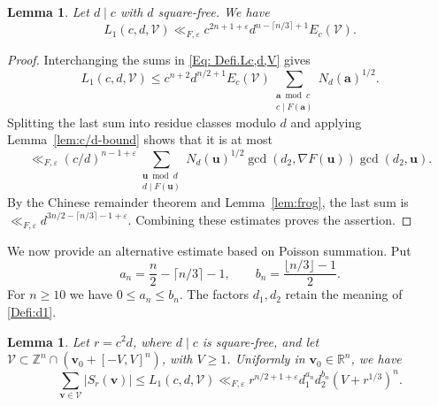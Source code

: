 \documentclass[a4paper,11pt, twoside,reqno]{amsart}
\theoremstyle{plain}
\newtheorem{lemma}[thm]{Lemma}
\theoremstyle{definition}
\theoremstyle{remark}
\newcommand{\bfv}{\bm{v}}
\newcommand{\ZZ}{\mathbb{Z}}
\newcommand{\RR}{\mathbb{R}}
\newcommand{\ve}{\varepsilon}
\renewcommand{\le}{\leqslant}
\renewcommand{\ge}{\geqslant}
\numberwithin{equation}{section}
\begin{document}
	
\begin{lemma}\label{lem:cube-sum1}
Let $d\mid c$ with $d$ square-free.
We have
\[
L_1(c,d,\mathcal V)
\ll_{F,\varepsilon}
c^{2n+1+\varepsilon}d^{n-\lceil n/3\rceil+1}E_c(\mathcal V).
\]
\end{lemma}

\begin{proof}
Interchanging the sums in \eqref{Eq: Defi.Lc,d,V} gives
\[
L_1(c,d,\mathcal V)
\le c^{n+2}d^{n/2+1}E_c(\mathcal V)
\sum_{\substack{\bm a\bmod c\\c\mid F(\bm a)}}N_d(\bm a)^{1/2}.
\]
Splitting the last sum into residue classes modulo $d$ and applying
Lemma~\ref{lem:c/d-bound} shows that it is at most
\[
\ll_{F,\varepsilon}(c/d)^{n-1+\varepsilon}
\sum_{\substack{\bm u\bmod d\\d\mid F(\bm u)}}
N_d(\bm u)^{1/2}
\gcd(d_2,\nabla F(\bm u))\gcd(d_2,\bm u).
\]
By the Chinese remainder theorem and Lemma~\ref{lem:frog}, the last
sum is $\ll_{F,\varepsilon}d^{3n/2 - \lceil n/3\rceil - 1+\varepsilon}$.
Combining these estimates proves the assertion.
\end{proof}

We now provide an alternative estimate based on Poisson summation.
Put
\begin{equation}\label{eq:poisson-weight-exponents}
 a_n=\frac n2-\lceil n/3\rceil-1,\qquad b_n=\frac{\lfloor n/3\rfloor-1}{2}.
\end{equation}
For $n\ge10$ we have $0\le a_n\le b_n$.
The factors $d_1,d_2$ retain the meaning of \eqref{Defi:d1}.

\begin{lemma}\label{lem:onion}
Let $r=c^2d$, where $d\mid c$ is square-free, and let
$\mathcal V\subset\ZZ^n\cap(\bfv_0+[-V,V]^n)$, with $V\ge1$.
Uniformly in $\bfv_0\in\RR^n$, we have
\[
 \sum_{\bfv\in\mathcal V}|S_r(\bfv)|
 \le L_1(c,d,\mathcal V)
 \ll_{F,\ve}
 r^{n/2+1+\ve}d_1^{a_n}d_2^{b_n}(V+r^{1/3})^n.
\]
\end{lemma}
\end{document}

